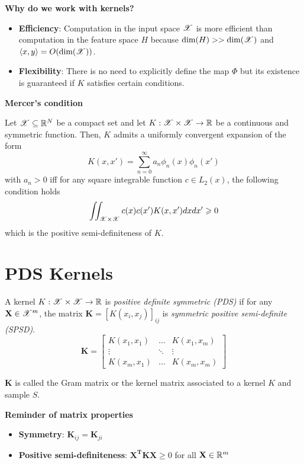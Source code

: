 \documentclass[a4paper,english,12pt]{article}
\begin{document}
\begin{rem}
	\textbf{Why do we work with kernels?}
\begin{itemize}
	\item \textbf{Efficiency}: Computation in the input space $\mathscr{X}$ is more efficient than computation in the feature space $H$ because $\text{dim}(H) >> \text{dim}(\mathscr{X})$ and $\langle x, y \rangle = O(\text{dim}(\mathscr{X}))$.
	\item \textbf{Flexibility}: There is no need to explicitly define the map $\Phi$ but its existence is guaranteed if $K$ satisfies certain conditions.
\end{itemize}
\end{rem}

\begin{thm}
	\textbf{Mercer's condition}
	
Let $\mathscr{X} \subseteq \mathbb{R}^{N}$ be a compact set and let $K: \mathscr{X} \times \mathscr{X} \rightarrow\mathbb{R}$ be a continuous and symmetric function. Then, $K$ admits a uniformly convergent expansion of the form
\[K(x,x') = \sum_{n=0}^{\infty} a_n \phi_n(x) \phi_n(x')\]
with $a_n > 0$ iff for any square integrable function $c \in L_2 (x)$, the following condition holds
\[\iint_{\mathscr{X} \times \mathscr{X}} c(x) c(x') K(x, x') dx dx' \geqslant 0\]
which is the positive semi-definiteness of $K$.
\end{thm}

\section{PDS Kernels}

\begin{defn}
	A kernel $K: \mathscr{X} \times \mathscr{X} \rightarrow \mathbb{R}$ is \textit{positive definite symmetric (PDS)} if for any $\mathbf{X} \in \mathscr{X}^{m}$, the matrix $\mathbf{K} = [K(x_i, x_j)]_{ij}$ is \textit{symmetric positive semi-definite (SPSD)}.
\[\mathbf{K} =
\begin{bmatrix}
	K(x_1,x_1) 	& \dots 	& K(x_1, x_m) \\
	\vdots		& \ddots 	& \vdots \\
	K(x_m, x_1) & \dots		& K(x_m, x_m)
\end{bmatrix}
\] 

$\mathbf{K}$ is called the Gram matrix or the kernel matrix associated to a kernel $K$ and sample $S$.
\begin{rem}
	\textbf{Reminder of matrix properties}
	\begin{itemize}
		\item \textbf{Symmetry}: $\mathbf{K}_{ij} = \mathbf{K}_{ji}$
		\item \textbf{Positive semi-definiteness}: $\mathbf{X^T K X} \ge 0$ for all $\mathbf{X} \in \mathbb{R}^m$
	\end{itemize}
\end{rem}
\end{defn}
\end{document}
